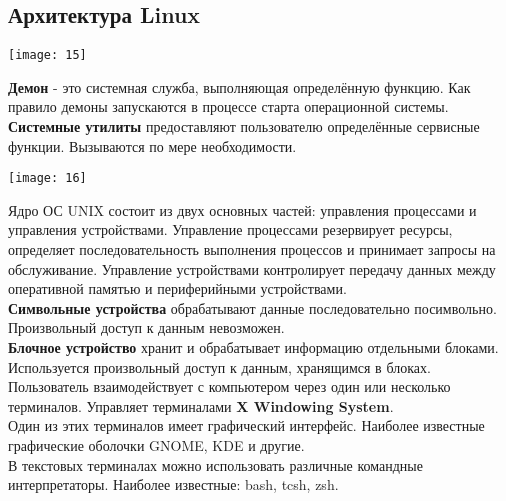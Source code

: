 \documentclass[a4paper]{article}
\begin{document}
\subsection{Архитектура Linux}
\begin{center}
        \texttt{[image: 15]}
\end{center}
\textbf{Демон}  - это системная служба, выполняющая определённую функцию. Как правило демоны запускаются в процессе старта операционной системы.\\
\textbf{Системные утилиты} предоставляют пользователю определённые сервисные функции. Вызываются по мере необходимости. 
\begin{center}
	\texttt{[image: 16]}
\end{center}
Ядро ОС UNIX состоит из двух основных частей: управления процессами и управления устройствами. Управление процессами резервирует ресурсы, определяет последовательность выполнения процессов и принимает запросы на обслуживание. Управление устройствами контролирует передачу данных между оперативной памятью и периферийными устройствами.\\
\textbf{Символьные устройства} обрабатывают данные последовательно посимвольно. Произвольный доступ к данным невозможен.\\
\textbf{Блочное устройство} хранит и обрабатывает информацию отдельными блоками. Используется произвольный доступ к данным, хранящимся в блоках.\\
Пользователь взаимодействует с компьютером через один или несколько терминалов. Управляет терминалами \textbf{X Windowing System}.\\
Один из этих терминалов имеет графический интерфейс. Наиболее известные графические оболочки GNOME, KDE и другие.\\
В текстовых терминалах можно использовать различные командные интерпретаторы. Наиболее известные: bash, tcsh, zsh.
\end{document}
